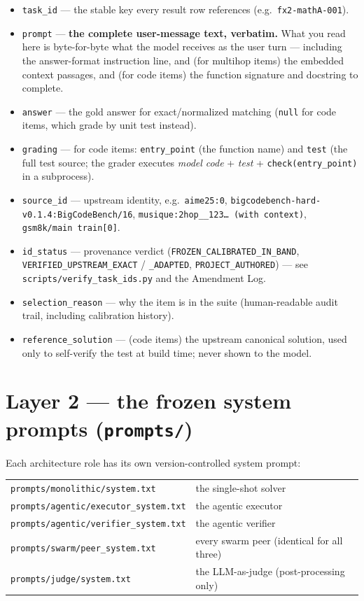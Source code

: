 \documentclass[11pt]{article}
\newcommand{\field}[1]{\texttt{#1}}
\begin{document}
\begin{itemize}
  \item \field{task\_id} --- the stable key every result row references (e.g.\ \texttt{fx2-mathA-001}).
  \item \field{prompt} --- \textbf{the complete user-message text, verbatim.} What
    you read here is byte-for-byte what the model receives as the user turn ---
    including the answer-format instruction line, and (for multihop items) the
    embedded context passages, and (for code items) the function signature and
    docstring to complete.
  \item \field{answer} --- the gold answer for exact/normalized matching
    (\texttt{null} for code items, which grade by unit test instead).
  \item \field{grading} --- for code items: \field{entry\_point} (the function
    name) and \field{test} (the full test source; the grader executes
    \emph{model code} + \emph{test} + \texttt{check(entry\_point)} in a
    subprocess).
  \item \field{source\_id} --- upstream identity, e.g.\
    \texttt{aime25:0}, \texttt{bigcodebench-hard-v0.1.4:BigCodeBench/16},
    \texttt{musique:2hop\_\_123\ldots\ (with context)}, \texttt{gsm8k/main train[0]}.
  \item \field{id\_status} --- provenance verdict
    (\texttt{FROZEN\_CALIBRATED\_IN\_BAND}, \texttt{VERIFIED\_UPSTREAM\_EXACT} /
    \texttt{\_ADAPTED}, \texttt{PROJECT\_AUTHORED}) --- see
    \texttt{scripts/verify\_task\_ids.py} and the Amendment Log.
  \item \field{selection\_reason} --- why the item is in the suite (human-readable
    audit trail, including calibration history).
  \item \field{reference\_solution} --- (code items) the upstream canonical
    solution, used only to self-verify the test at build time; never shown to the model.
\end{itemize}

\section{Layer 2 --- the frozen system prompts (\texttt{prompts/})}

Each architecture role has its own version-controlled system prompt:

\begin{tabular}{p{3.15in}p{2.85in}}
\texttt{prompts/monolithic/system.txt} & the single-shot solver\\
\texttt{prompts/agentic/executor\_system.txt} & the agentic executor\\
\texttt{prompts/agentic/verifier\_system.txt} & the agentic verifier\\
\texttt{prompts/swarm/peer\_system.txt} & every swarm peer (identical for all three)\\
\texttt{prompts/judge/system.txt} & the LLM-as-judge (post-processing only)\\
\end{tabular}
\end{document}
